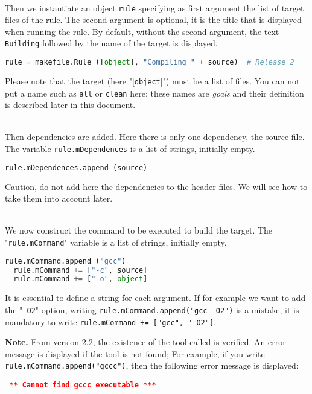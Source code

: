 \documentclass[a4paper,11pt]{extarticle}
\begin{document}
~\\Then we instantiate an object \texttt{rule}  specifying as first argument the list of target files of the rule. The second argument is optional, it is the title that is displayed when running the rule. By default, without the second argument, the text \texttt{Building}  followed by the name of the target is displayed.
\begin{lstlisting}[language=py]
  rule = makefile.Rule ([object], "Compiling " + source)  # Release 2
\end{lstlisting}
Please note that the target (here "[\texttt{object}]") must be a list of files. You can not put a name such as \texttt{all} or \texttt{clean} here: these names are \emph{goals} and their definition is described later in this document.

~\\Then dependencies are added. Here there is only one dependency, the source file. The variable \texttt{rule.mDependences} is a list of strings, initially empty.
\begin{lstlisting}[language=py]
  rule.mDependences.append (source)
\end{lstlisting}
Caution, do not add here the dependencies to the header files. We will see how to take them into account later.

~\\We now construct the command to be executed to build the target. The "\texttt{rule.mCommand}" variable is a list of strings, initially empty.
\begin{lstlisting}[language=py]
  rule.mCommand.append ("gcc")
  rule.mCommand += ["-c", source]
  rule.mCommand += ["-o", object]
\end{lstlisting}
It is essential to define a string for each argument. If for example we want to add the "\texttt{-O2}" option, writing \texttt{rule.mCommand.append("gcc -O2")} is a mistake, it is mandatory to write \texttt{rule.mCommand += ["gcc", "-O2"]}.

{\bf Note.}\label{verifUtilitaire}
From version 2.2, the existence of the tool called is verified. An error message is displayed if the tool is not found; For example, if you write \texttt{rule.mCommand.append("gccc")}, then the following error message is displayed:

\begin{mdframed}[hidealllines=true,backgroundcolor=lightgray!20]
\tt\footnotesize
\textcolor{red}{\bf*** Cannot find~\textquotesingle gccc\textquotesingle~executable ***}
\end{mdframed}
\end{document}
